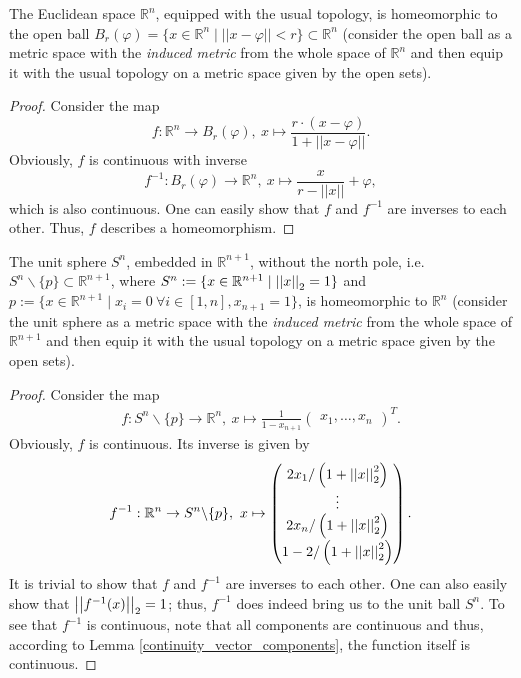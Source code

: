 \begin{exmp}
	The Euclidean space $\mathbb R^n$, equipped with the usual topology, is homeomorphic to the open ball $B_{r}(\varphi) =  \{x\in\mathbb R^n \mid \lvert\lvert x-\varphi \rvert\rvert < r \} \subset \mathbb R^n$ (consider the open ball as a metric space with the \textit{induced metric} from the whole space of $\mathbb R^n$ and then equip it with the usual topology on a metric space given by the open sets). 
\end{exmp}

\begin{proof}
	Consider the map $$f: \mathbb R^n\rightarrow B_r(\varphi), \ x\mapsto \frac{r\cdot (x-\varphi)}{1+\lvert\lvert x-\varphi\rvert\rvert}.$$ Obviously, $f$ is continuous with inverse $$f^{-1}: B_r(\varphi)\rightarrow \mathbb R^n, \ x \mapsto \frac{x}{r-\lvert\lvert x\rvert\rvert}+\varphi,$$ which is also continuous. One can easily show that $f$ and $f^{-1}$ are inverses to each other. Thus, $f$ describes a homeomorphism. 	
\end{proof}

\begin{exmp}
	The unit sphere $S^n$, embedded in $\mathbb R^{n+1}$, without the north pole, i.e. $S^n\backslash \{p\} \subset \mathbb R^{n+1}$, where $S^n := \{ x\in\mathbb R^{n+1} \mid \left\vert\left\vert x \right\vert\right\vert_{2} = 1 \}$ and $p := \{ x\in\mathbb R^{n+1} \mid x_i = 0 \ \forall i\in[1, n], x_{n+1} = 1 \}$, is homeomorphic to $\mathbb R^n$ (consider the unit sphere as a metric space with the \textit{induced metric} from the whole space of $\mathbb R^{n+1}$ and then equip it with the usual topology on a metric space given by the open sets). 
\end{exmp}
\begin{proof}
	Consider the map 
	\begin{align}
		f: S^n\backslash\{p\}\rightarrow \mathbb R^n, \ x\mapsto \frac{1}{1-x_{n+1}}\begin{pmatrix} x_1, \dots, x_n \end{pmatrix}^T. 
	\end{align}
	Obviously, $f$ is continuous. Its inverse is given by 
	\begin{align}\label{stereographic_map_inverse}
		f^{-1}: \mathbb R^n \rightarrow S^n\backslash\{p\}, \ x\mapsto \begin{pmatrix} 2x_1/ \left(1+\left\vert\left\vert x \right\vert\right\vert_{2}^2\right)\\ \vdots\\ 2x_n/\left(1+\left\vert\left\vert x \right\vert\right\vert_{2}^2\right) \\[4pt] 1-2/\left(1+\left\vert\left\vert x \right\vert\right\vert_{2}^2\right) \end{pmatrix}.  
	\end{align}
	It is trivial to show that $f$ and $f^{-1}$ are inverses to each other. One can also easily show that $\left\vert\left\vert f^{-1}(x) \right\vert\right\vert_{2} = 1$; thus, $f^{-1}$ does indeed bring us to the unit ball $S^n$. 
	To see that $f^{-1}$ is continuous, note that all components are continuous and thus, according to Lemma \ref{continuity_vector_components}, the function itself is continuous. 
\end{proof} 

